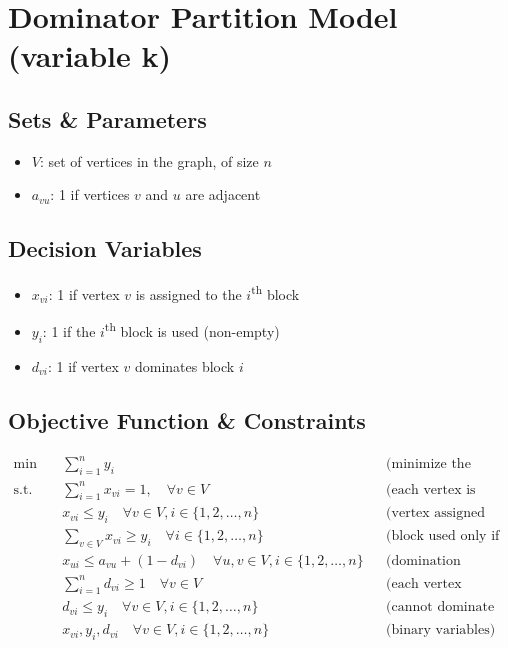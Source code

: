 \section{Dominator Partition Model (variable k)}
\label{sec:dominator_partition}


\subsection{Sets \& Parameters}
\begin{itemize}[label=, noitemsep]
    \item $V$: set of vertices in the graph, of size $n$
    \item $a_{vu}$: 1 if vertices $v$ and $u$ are adjacent
\end{itemize}

\subsection{Decision Variables}
\begin{itemize}[label=, noitemsep]
    \item $x_{vi}$: 1 if vertex $v$ is assigned to the $i$\textsuperscript{th} block
    \item $y_{i}$: 1 if the $i$\textsuperscript{th} block is used (non-empty)
    \item $d_{vi}$: 1 if vertex $v$ dominates block $i$
\end{itemize}

\subsection{Objective Function \& Constraints}
\begin{align*}
    \min \quad &\sum_{i=1}^{n} y_i &&\text{(minimize the number of blocks used)}\\
    \text{s.t.} \quad
    &\sum_{i=1}^{n} x_{vi} = 1, \quad \forall v \in V &&\text{(each vertex is assigned to exactly one block)}\\
    &x_{vi} \leq y_i \quad \forall v \in V, i \in \{1, 2, \dots, n\} &&\text{(vertex assigned only if block used)}\\
    & \sum_{v \in V} x_{vi} \geq y_i \quad \forall i \in \{1, 2, \dots, n\} &&\text{(block used only if it is not empty)}\\
    &x_{ui} \leq a_{vu} + (1 - d_{vi}) \quad \forall u,v \in V, i \in \{1, 2, \dots, n\} &&\text{(domination condition)}\\
    &\sum_{i=1}^{n} d_{vi} \geq 1 \quad \forall v \in V &&\text{(each vertex dominates at least one block)}\\
    & d_{vi} \leq y_i \quad \forall v \in V, i \in \{1, 2, \dots, n\} &&\text{(cannot dominate an empty block)}\\
    &x_{vi}, y_i, d_{vi} \quad \forall v \in V, i \in \{1, 2, \dots, n\} &&\text{(binary variables)}\\
\end{align*}
